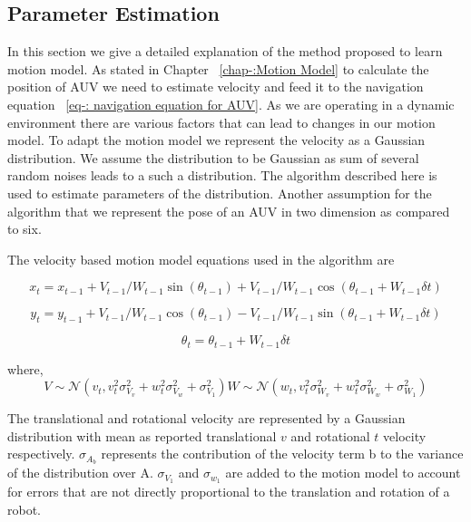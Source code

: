 \documentclass[12pt,draft]{dalcsthesis}
\begin{document}
\subsection{Parameter Estimation}
\label{ch:adapting the motion model}
In this section we give a detailed explanation of the method proposed to learn motion model. As stated in Chapter ~\ref{chap-:Motion Model} to calculate the position of AUV we need to estimate velocity and feed it to the navigation equation ~\ref{eq-: navigation equation for AUV}. As we are operating in a dynamic environment there are various factors that can lead to changes in our motion model. To adapt the motion model we represent the velocity as a Gaussian distribution. We assume the distribution to be Gaussian as sum of several random noises leads to a such a distribution.   The algorithm described here is used to estimate parameters of the distribution. Another assumption for the algorithm that we represent the pose of an AUV in two dimension as compared to six. 

The velocity based motion model equations used in the algorithm are 

\begin{equation}
 x_{t}=x_{t-1}+V_{t-1}/W_{t-1} \sin(\theta_{t-1})+ V_{t-1}/W_{t-1} \cos(\theta_{t-1} + W_{t-1} \delta t)
\end{equation}

\begin{equation}
\label{eq:velocity motion model_y}
y_{t}=y_{t-1}+V_{t-1}/W_{t-1} \cos(\theta_{t-1})- V_{t-1}/W_{t-1} \sin(\theta_{t-1} + W_{t-1} \delta t)
\end{equation}

\begin{equation}
\label{eq:velocity motion model_theta}
\theta_{t}=\theta_{t-1}+ W_{t-1} \delta t
\end{equation}

where,
\begin{equation}
V \sim \mathcal{N}(v_{t},v_{t}^{2}\sigma_{V_{v}}^{2}+w_{t}^{2}\sigma_{V_{w}}^{2}+\sigma_{V_{1}}^{2})
W \sim \mathcal{N}(w_{t},v_{t}^{2}\sigma_{W_{v}}^{2}+w_{t}^{2}\sigma_{W_{w}}^{2}+\sigma_{W_{1}}^{2})
\end{equation}


The translational and rotational velocity are represented by a Gaussian distribution with mean as reported translational $v$ and rotational $t$ velocity respectively. $\sigma_{A_{b}}$ represents the contribution of the velocity term b to the variance of the distribution over A. $\sigma_{V_{1}} $ and $\sigma_{w_{1}}$ are added to the motion model to account for errors that are not directly proportional to the translation and rotation of a robot.
\end{document}
